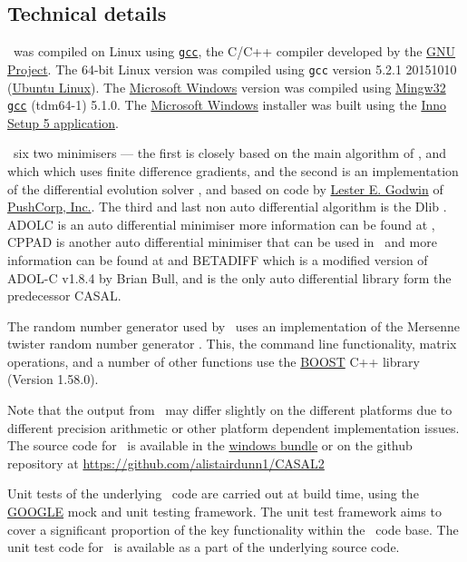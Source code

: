 \subsection{Technical details}\label{sec:tech}
\CNAME\ was compiled on Linux using \href{http://gcc.gnu.org}{\texttt{gcc}}, the C/C++ compiler developed by the \href{http://gcc.gnu.org}{GNU Project}. The 64-bit Linux  version was compiled using \texttt{gcc} version 5.2.1 20151010 (\href{http://www.ubuntu.com/}{Ubuntu Linux}). The \href{http://www.microsoft.com}{Microsoft Windows} version was compiled using \href{http://www.mingw.org}{Mingw32} \href{http://gcc.gnu.org}{\texttt{gcc}} (tdm64-1) 5.1.0. The \href{http://www.microsoft.com}{Microsoft Windows} installer was built using the \href{http://www.jrsoftware.org/isdl.php}{Inno Setup 5 application}.

\CNAME\ six two minimisers --- the first is closely based on the main algorithm of \cite{779}, and which which uses finite difference gradients, and the second is an implementation of the differential evolution solver \citep{1442}, and based on code by \href{mailto:<godwin@pushcorp.com>}{Lester E. Godwin} of \href{http://www.pushcorp.com}{PushCorp, Inc.}. The third and last non auto differential algorithm is the Dlib \citep{dlib09}. ADOLC is an auto differential minimiser more information can be found at \cite{walther1996adolc}, CPPAD is another auto differential minimiser that can be used in \CNAME\ and more information can be found at \cite{wachter2006cppad} and BETADIFF which is a modified version of ADOL-C v1.8.4 by Brian Bull, and is the only auto differential library form the predecessor CASAL.

The random number generator used by \CNAME\ uses an implementation of the Mersenne twister random number generator \citep{796}. This, the command line functionality, matrix operations, and a number of other functions use the \href{http://www.boost.org/}{BOOST} C++ library (Version 1.58.0).

Note that the output from \CNAME\ may differ slightly on the different platforms due to different precision arithmetic or other platform dependent implementation issues. The source code for \CNAME\ is available in the \href{ftp://ftp.niwa.co.nz/incoming/CASAL2_auto_build/casal2.tar.gz}{windows bundle} or on the github repository at \url{https://github.com/alistairdunn1/CASAL2}

Unit tests of the underlying \CNAME\ code are carried out at build time, using the \href{http://www.boost.org/}{GOOGLE} mock and unit testing framework. The unit test framework aims to cover a significant proportion of the key functionality within the \CNAME\ code base. The unit test code for \CNAME\ is available as a part of the underlying source code.

